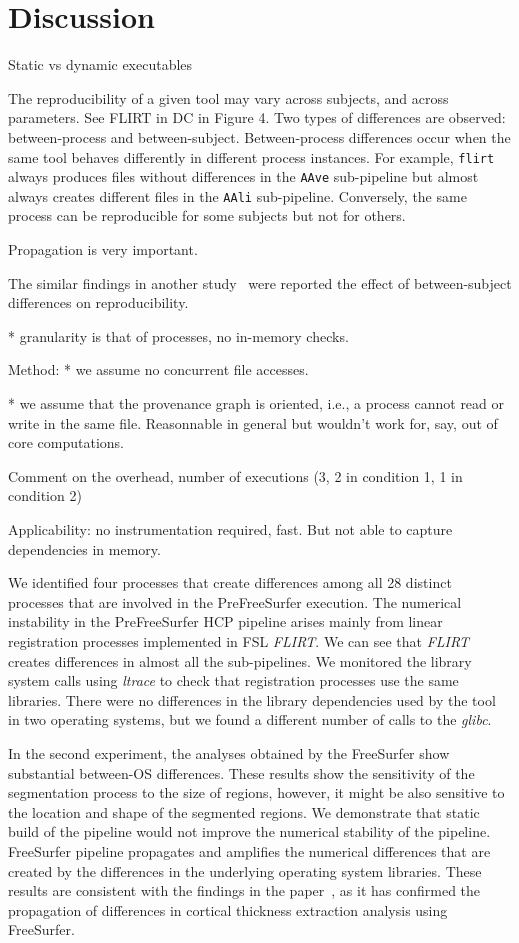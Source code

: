 \documentclass[a4paper,num-refs]{oup-contemporary}
\begin{document}
\section{Discussion}

Static vs dynamic executables

The reproducibility of a given tool may vary across subjects, and across parameters. 
See FLIRT in DC in Figure 4.
Two types of differences are observed: between-process and between-subject.
Between-process differences occur when the same tool behaves differently in different process instances.
For example, \texttt{flirt}
always produces files without differences in the \texttt{AAve} sub-pipeline but 
almost always creates different files in the \texttt{AAli} sub-pipeline.
Conversely, the same process can be reproducible for some subjects but not for others. 



Propagation is very important. 

  The similar findings in another study~\cite{bowring2019exploring} were reported 
  the effect of between-subject differences on reproducibility.

* granularity is that
 of processes, no in-memory checks.

Method:
* we assume no concurrent file accesses.

* we assume that the provenance graph is oriented, i.e., a process cannot read or write in the same file. Reasonnable in general but wouldn't work 
for, say, out of core computations.

Comment on the overhead, number of executions (3, 2 in condition 1, 1 in condition 2)

Applicability: no instrumentation required, fast.
But not able to capture dependencies in memory.

We identified four processes that create differences 
among all 28 distinct processes that are involved in the PreFreeSurfer execution. 
The numerical instability in the 
PreFreeSurfer HCP pipeline arises mainly from linear 
registration processes implemented in FSL \emph{FLIRT}. 
We can see that \emph{FLIRT} creates differences in almost all the sub-pipelines. 
We monitored the library system calls using \emph{ltrace} to check that registration processes
use the same libraries. There were no differences in the library dependencies used by 
the tool in two operating systems, but we found a different number of calls to the \emph{glibc}.

In the second experiment, 
the analyses obtained by the FreeSurfer show substantial between-OS differences.
These results show the sensitivity of the segmentation process to the 
size of regions, however, it might be also sensitive to the location and shape of 
the segmented regions.
We demonstrate that static build of the pipeline would not improve the numerical stability of the pipeline. 
FreeSurfer pipeline propagates and amplifies the numerical differences that are created by the 
differences in the underlying operating system libraries.
These results are consistent with the findings in the paper~\cite{Glatard2015}, 
as it has confirmed the propagation of differences in cortical thickness extraction analysis using FreeSurfer.
\end{document}
